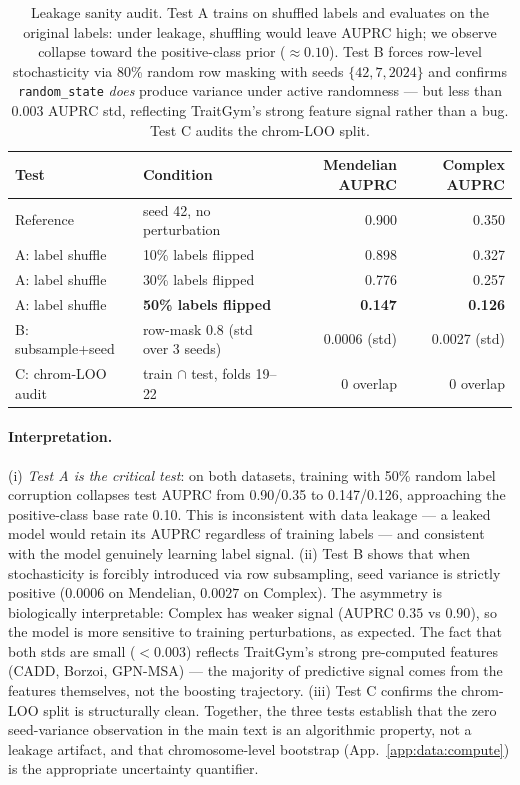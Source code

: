 \begin{table}[h]
\centering
\small
\caption{Leakage sanity audit. Test A trains on shuffled labels and evaluates on the original labels: under leakage, shuffling would leave AUPRC high; we observe collapse toward the positive-class prior ($\approx 0.10$). Test B forces row-level stochasticity via 80\% random row masking with seeds $\{42,7,2024\}$ and confirms \texttt{random\_state} \emph{does} produce variance under active randomness --- but less than $0.003$ AUPRC std, reflecting TraitGym's strong feature signal rather than a bug. Test C audits the chrom-LOO split.}
\label{tab:leakage_sanity}
\setlength{\tabcolsep}{4pt}
\begin{tabular}{llrr}
\toprule
Test & Condition & Mendelian AUPRC & Complex AUPRC \\
\midrule
Reference          & seed 42, no perturbation                  & 0.900          & 0.350          \\
\midrule
A: label shuffle   & 10\% labels flipped                        & 0.898          & 0.327          \\
A: label shuffle   & 30\% labels flipped                        & 0.776          & 0.257          \\
A: label shuffle   & \textbf{50\% labels flipped}               & \textbf{0.147} & \textbf{0.126} \\
\midrule
B: subsample+seed  & row-mask 0.8 (std over 3 seeds)            & 0.0006 (std)   & 0.0027 (std)   \\
\midrule
C: chrom-LOO audit & train $\cap$ test, folds 19--22            & 0 overlap      & 0 overlap      \\
\bottomrule
\end{tabular}
\end{table}

\paragraph{Interpretation.}
(i) \emph{Test A is the critical test}: on both datasets, training with 50\% random label corruption collapses test AUPRC from 0.90/0.35 to 0.147/0.126, approaching the positive-class base rate 0.10. This is inconsistent with data leakage --- a leaked model would retain its AUPRC regardless of training labels --- and consistent with the model genuinely learning label signal.
(ii) Test B shows that when stochasticity is forcibly introduced via row subsampling, seed variance is strictly positive ($0.0006$ on Mendelian, $0.0027$ on Complex). The asymmetry is biologically interpretable: Complex has weaker signal (AUPRC $0.35$ vs $0.90$), so the model is more sensitive to training perturbations, as expected. The fact that both stds are small ($< 0.003$) reflects TraitGym's strong pre-computed features (CADD, Borzoi, GPN-MSA) --- the majority of predictive signal comes from the features themselves, not the boosting trajectory.
(iii) Test C confirms the chrom-LOO split is structurally clean.
Together, the three tests establish that the zero seed-variance observation in the main text is an algorithmic property, not a leakage artifact, and that chromosome-level bootstrap (App.~\ref{app:data:compute}) is the appropriate uncertainty quantifier.

